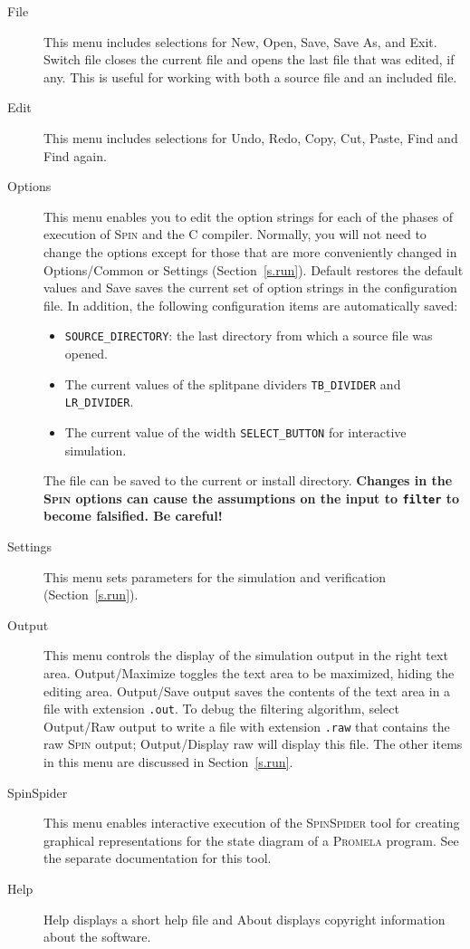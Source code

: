 \documentclass[11pt]{article}
\newcommand{\spn}{\textsc{Spin}}
\newcommand{\prm}{\textsc{Promela}}
\newcommand{\spd}{\textsc{SpinSpider}}
\newcommand{\p}[1]{\texttt{#1}}
\newcommand{\bu}[1]{\textsf{#1}}
\begin{document}
\begin{description}
\item[\bu{File}] This menu includes selections for \bu{New}, \bu{Open}, 
\bu{Save}, \bu{Save As}, and \bu{Exit}. \bu{Switch file} closes the 
current file and opens the last file that was edited, if any. This is 
useful for working with both a source file and an included file.

\item[\bu{Edit}] This menu includes selections for \bu{Undo}, \bu{Redo}, 
\bu{Copy}, \bu{Cut}, \bu{Paste}, \bu{Find} and \bu{Find again}.

\item[\bu{Options}] This menu enables you to edit the option strings for 
each of the phases of execution of \spn{} and the C compiler. Normally, you
will not need to change the options except for those that are more
conveniently changed in \bu{Options/Common} or \bu{Settings}
(Section~\ref{s.run}). \bu{Default} restores the default 
values and \bu{Save} saves the current set of option strings in the 
configuration file. In addition, the following configuration items are
automatically saved:
\begin{itemize}
\item \p{SOURCE\_DIRECTORY}: the last directory from which a source file was opened.
\item The current values of the splitpane dividers \p{TB\_DIVIDER} and
\p{LR\_DIVIDER}.
\item The current value of the width \p{SELECT\_BUTTON} for interactive
simulation.
\end{itemize}
The file can be saved
to the \bu{current} or \bu{install} directory. \textbf{Changes in the
\spn{} options can cause the assumptions on the input to \p{filter} to
become falsified. Be careful!}

\item[\bu{Settings}] This menu sets parameters for the simulation and 
verification (Section~\ref{s.run}).

\item[\bu{Output}] This menu controls the display of the simulation output
in the right text area. \bu{Output/Maximize} toggles the text area to be
maximized, hiding the editing area. \bu{Output/Save output} saves the
contents of the text area in a file with extension \p{.out}.
To debug the filtering algorithm,
select \bu{Output/Raw output} to write a file with extension
\p{.raw} that contains the raw \spn{} output;
\bu{Output/Display raw} will display this file.
The other items in this menu are discussed in Section~\ref{s.run}.

\item[\bu{SpinSpider}] This menu enables interactive execution of the \spd{} 
tool for creating graphical representations for the state diagram of a 
\prm{} program. See the separate documentation for this tool.

\item[\bu{Help}] \bu{Help} displays a short help file and \bu{About} 
displays copyright information about the software.
\end{description}
\end{document}
